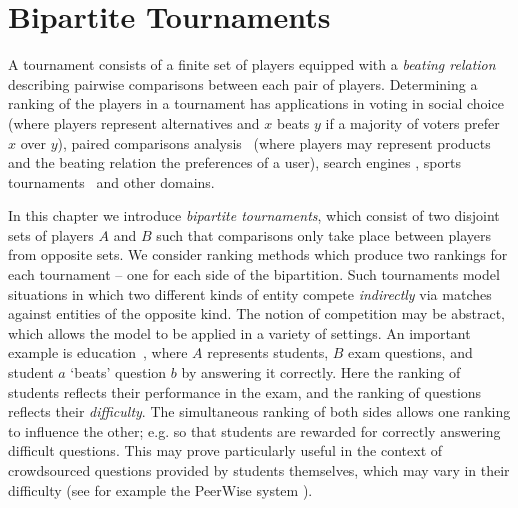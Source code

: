 \chapter{Bipartite Tournaments}
\label{chapter_bipartite_tournaments}


A tournament consists of a finite set of players equipped with a \emph{beating
relation} describing pairwise comparisons between each pair of players.
Determining a ranking of the players in a tournament has applications in voting
in social choice~\cite{brandt2016a} (where players represent alternatives and
$x$ beats $y$ if a majority of voters prefer $x$ over $y$), paired comparisons
analysis~\cite{gonzalez2014paired} (where players may represent products and
the beating relation the preferences of a user), search engines
\cite{slutzki2006scoring}, sports tournaments~\cite{bozoki2016application} and
other domains.

In this chapter we introduce \emph{bipartite tournaments}, which consist of two
disjoint sets of players $A$ and $B$ such that comparisons only take place
between players from opposite sets. We consider ranking methods which produce
two rankings for each tournament -- one for each side of the bipartition. Such
tournaments model situations in which two different kinds of entity compete
\emph{indirectly} via matches against entities of the opposite kind.
%
The notion of competition may be abstract, which allows the model to be applied
in a variety of settings. An important example is
education~\cite{jiao2017algorithms}, where $A$ represents students, $B$ exam
questions, and student $a$ `beats' question $b$ by answering it correctly. Here
the ranking of students reflects their performance in the exam, and the ranking
of questions reflects their \emph{difficulty}. The simultaneous ranking of both
sides allows one ranking to influence the other; e.g. so that students are
rewarded for correctly answering difficult questions. This may prove
particularly useful in the context of crowdsourced questions provided by
students themselves, which may vary in their difficulty (see for example the
PeerWise system \cite{denny_peerwise_2008}).

